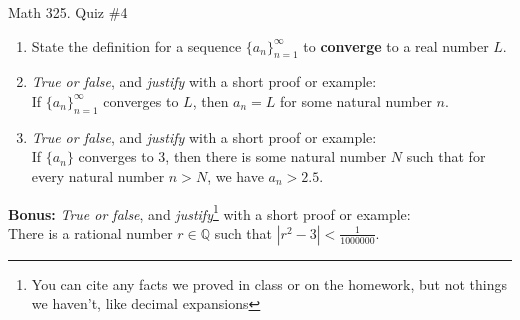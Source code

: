 \documentclass[12pt]{amsart}
\newcommand{\Q}{\mathbb{Q}}
\begin{document}
	
	\thispagestyle{empty}
	
	\begin{center}
		\Large{Math 325. Quiz \#4 }\\

	\end{center}
	
	
	
	\bigskip
	
	\begin{enumerate}
	
	\item State the definition for a sequence $\{a_n\}_{n=1}^\infty$ to \textbf{converge} to a real number $L$.
	
	\vfill\vfill
	
	\item  \emph{True or false}, and \emph{justify} with a short proof or example:\\
If $\{a_n\}_{n=1}^\infty$ converges to $L$, then $a_n=L$ for some natural number $n$.


\vfill\vfill\vfill 


\item  \emph{True or false}, and \emph{justify} with a short proof or example:\\
If $\{a_n\}$ converges to $3$, then there is some natural number $N$ such that for every natural number $n>N$, we have $a_n>2.5$.
		
\vfill\vfill\vfill





\end{enumerate}

\newpage

\textbf{Bonus:} \emph{True or false}, and \emph{justify}\footnote{You can cite any facts we proved in class or on the homework, but not things we haven't, like decimal expansions} with a short proof or example:\\
There is a rational number $r\in \Q$ such that $\displaystyle |r^2 - 3| < \frac{1}{1000000}$.

	
	
\end{document}
